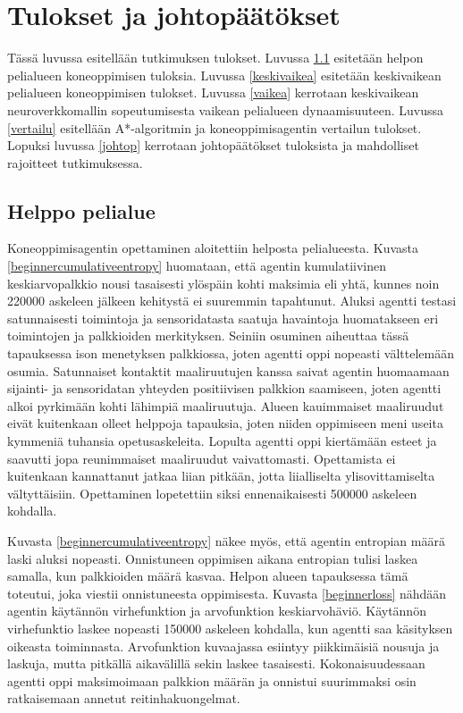 \documentclass[utf8]{gradu3}
\begin{document}
\chapter{Tulokset ja johtopäätökset}
\label{tulokset}

Tässä luvussa esitellään tutkimuksen tulokset. Luvussa \ref{helppo} esitetään helpon pelialueen koneoppimisen tuloksia. Luvussa \ref{keskivaikea} esitetään keskivaikean pelialueen koneoppimisen tulokset. Luvussa \ref{vaikea} kerrotaan keskivaikean neuroverkkomallin sopeutumisesta vaikean pelialueen dynaamisuuteen. Luvussa \ref{vertailu} esitellään A*-algoritmin ja koneoppimisagentin vertailun tulokset. Lopuksi luvussa \ref{johtop} kerrotaan johtopäätökset tuloksista ja mahdolliset rajoitteet tutkimuksessa.

\section{Helppo pelialue}
\label{helppo}

Koneoppimisagentin opettaminen aloitettiin helposta pelialueesta. Kuvasta \ref{beginnercumulativeentropy} huomataan, että agentin kumulatiivinen keskiarvopalkkio nousi tasaisesti ylöspäin kohti maksimia eli yhtä, kunnes noin 220000 askeleen jälkeen kehitystä ei suuremmin tapahtunut. Aluksi agentti testasi satunnaisesti toimintoja ja sensoridatasta saatuja havaintoja huomatakseen eri toimintojen ja palkkioiden merkityksen. Seiniin osuminen aiheuttaa tässä tapauksessa ison menetyksen palkkiossa, joten agentti oppi nopeasti välttelemään osumia. Satunnaiset kontaktit maaliruutujen kanssa saivat agentin huomaamaan sijainti- ja sensoridatan yhteyden positiivisen palkkion saamiseen, joten agentti alkoi pyrkimään kohti lähimpiä maaliruutuja. Alueen kauimmaiset maaliruudut eivät kuitenkaan olleet helppoja tapauksia, joten niiden oppimiseen meni useita kymmeniä tuhansia opetusaskeleita. Lopulta agentti oppi kiertämään esteet ja saavutti jopa reunimmaiset maaliruudut vaivattomasti. Opettamista ei kuitenkaan kannattanut jatkaa liian pitkään, jotta liialliselta ylisovittamiselta vältyttäisiin. Opettaminen lopetettiin siksi ennenaikaisesti 500000 askeleen kohdalla.

Kuvasta \ref{beginnercumulativeentropy} näkee myös, että agentin entropian määrä laski aluksi nopeasti. Onnistuneen oppimisen aikana entropian tulisi laskea samalla, kun palkkioiden määrä kasvaa. Helpon alueen tapauksessa tämä toteutui, joka viestii onnistuneesta oppimisesta. Kuvasta \ref{beginnerloss} nähdään agentin käytännön virhefunktion ja arvofunktion keskiarvohäviö. Käytännön virhefunktio laskee nopeasti 150000 askeleen kohdalla, kun agentti saa käsityksen oikeasta toiminnasta. Arvofunktion kuvaajassa esiintyy piikkimäisiä nousuja ja laskuja, mutta pitkällä aikavälillä sekin laskee tasaisesti. Kokonaisuudessaan agentti oppi maksimoimaan palkkion määrän ja onnistui suurimmaksi osin ratkaisemaan annetut reitinhakuongelmat.
\end{document}
